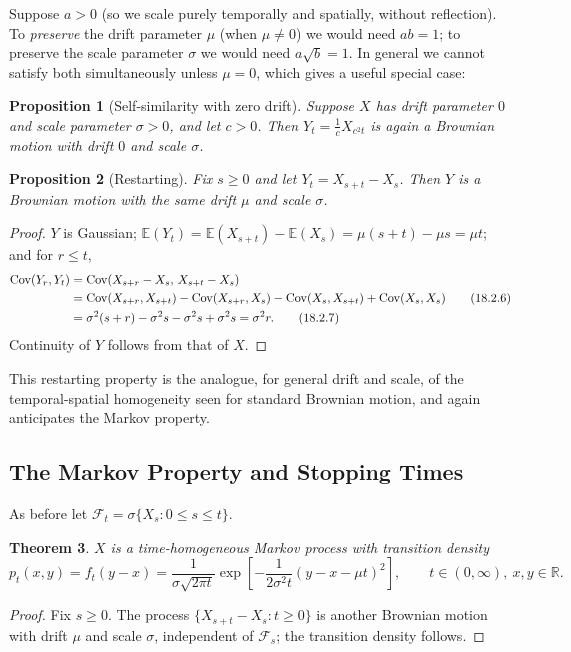 \documentclass[12pt,openany]{book}
\newtheorem{theorem}{Theorem}[section]
\newtheorem{proposition}[theorem]{Proposition}
\theoremstyle{definition}
\theoremstyle{remark}
\newcommand{\R}{\mathbb{R}}
\newcommand{\E}{\mathbb{E}}
\newcommand{\Fscr}{\mathcal{F}}
\DeclareMathOperator{\Cov}{Cov}
\begin{document}
Suppose $a>0$ (so we scale purely temporally and spatially, without reflection). To \emph{preserve} the drift parameter $\mu$ (when $\mu \ne 0$) we would need $ab=1$; to preserve the scale parameter $\sigma$ we would need $a\sqrt b = 1$. In general we cannot satisfy both simultaneously unless $\mu=0$, which gives a useful special case:
 
\begin{proposition}[Self-similarity with zero drift]
Suppose $X$ has drift parameter $0$ and scale parameter $\sigma>0$, and let $c>0$. Then $Y_t = \frac1c X_{c^2t}$ is again a Brownian motion with drift $0$ and scale $\sigma$.
\end{proposition}
 
\begin{proposition}[Restarting]
Fix $s\ge 0$ and let $Y_t = X_{s+t}-X_s$. Then $Y$ is a Brownian motion with the same drift $\mu$ and scale $\sigma$.
\end{proposition}
\begin{proof}
$Y$ is Gaussian; $\E(Y_t) = \E(X_{s+t})-\E(X_s) = \mu(s+t)-\mu s = \mu t$; and for $r\le t$,
\begin{align}
    \Cov(Y_r,Y_t) &= \Cov(X_{s+r}-X_s,\, X_{s+t}-X_s) \notag \\
    &= \Cov(X_{s+r},X_{s+t}) - \Cov(X_{s+r},X_s) - \Cov(X_s,X_{s+t}) + \Cov(X_s,X_s) \tag{18.2.6} \\
    &= \sigma^2(s+r) - \sigma^2 s - \sigma^2 s + \sigma^2 s = \sigma^2 r. \tag{18.2.7}
\end{align}
Continuity of $Y$ follows from that of $X$.
\end{proof}
 
This restarting property is the analogue, for general drift and scale, of the temporal-spatial homogeneity seen for standard Brownian motion, and again anticipates the Markov property.
 
\subsection{The Markov Property and Stopping Times}
 
As before let $\Fscr_t = \sigma\{X_s : 0\le s\le t\}$.
 
\begin{theorem}
$X$ is a time-homogeneous Markov process with transition density
\begin{equation}
    p_t(x,y) = f_t(y-x) = \frac{1}{\sigma\sqrt{2\pi t}}\exp\!\left[-\frac{1}{2\sigma^2t}(y-x-\mu t)^2\right], \qquad t\in(0,\infty),\ x,y\in\R. \tag{18.2.8}
\end{equation}
\end{theorem}
\begin{proof}
Fix $s\ge 0$. The process $\{X_{s+t}-X_s : t\ge 0\}$ is another Brownian motion with drift $\mu$ and scale $\sigma$, independent of $\Fscr_s$; the transition density follows.
\end{proof}
 
\end{document}
